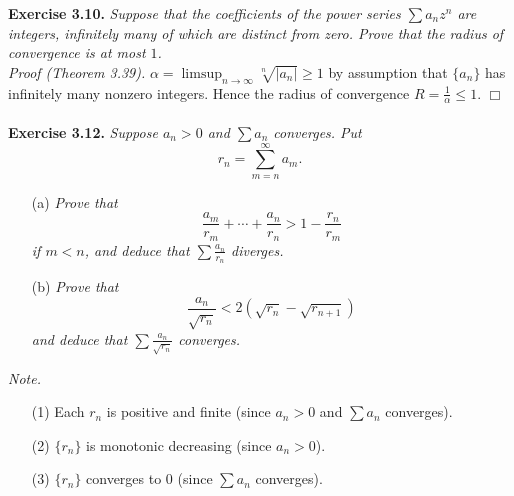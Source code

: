 \documentclass{article}
\begin{document}



\textbf{Exercise 3.10.}
\emph{Suppose that the coefficients of the power series $\sum a_n z^n$ are integers,
infinitely many of which are distinct from zero.
Prove that the radius of convergence is at most $1$.} \\

\emph{Proof (Theorem 3.39).}
$\alpha = \limsup_{n \to \infty} \sqrt[n]{|a_n|} \geq 1$ by assumption
that $\{a_n\}$ has infinitely many nonzero integers.
Hence the radius of convergence $R = \frac{1}{\alpha} \leq 1$.
$\Box$ \\\\






\textbf{Exercise 3.12.}
\emph{Suppose $a_n > 0$ and $\sum a_n$ converges.
Put
$$r_n = \sum_{m=n}^{\infty} a_m.$$}
\begin{enumerate}
\item[(a)]
\emph{Prove that
$$\frac{a_m}{r_m} + \cdots + \frac{a_n}{r_n} > 1 - \frac{r_n}{r_m}$$
if $m < n$, and deduce that $\sum \frac{a_n}{r_n}$ diverges.}
\item[(b)]
\emph{Prove that
$$\frac{a_n}{\sqrt{r_n}} < 2(\sqrt{r_n} - \sqrt{r_{n+1}})$$
and deduce that $\sum \frac{a_n}{\sqrt{r_n}}$ converges.} \\
\end{enumerate}

\emph{Note.}
\begin{enumerate}
\item[(1)]
Each $r_n$ is positive and finite (since $a_n > 0$ and $\sum a_n$ converges).
\item[(2)]
$\{r_n\}$ is monotonic decreasing (since $a_n > 0$).
\item[(3)]
$\{r_n\}$ converges to $0$ (since $\sum a_n$ converges). \\
\end{enumerate}
\end{document}
